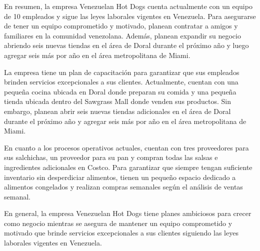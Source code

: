 En resumen, la empresa Venezuelan Hot Dogs cuenta actualmente con un equipo de 10 empleados y sigue las leyes laborales vigentes en Venezuela. Para asegurarse de tener un equipo comprometido y motivado, planean contratar a amigos y familiares en la comunidad venezolana. Además, planean expandir su negocio abriendo seis nuevas tiendas en el área de Doral durante el próximo año y luego agregar seis más por año en el área metropolitana de Miami.

La empresa tiene un plan de capacitación para garantizar que sus empleados brinden servicios excepcionales a sus clientes. Actualmente, cuentan con una pequeña cocina ubicada en Doral donde preparan su comida y una pequeña tienda ubicada dentro del Sawgrass Mall donde venden sus productos. Sin embargo, planean abrir seis nuevas tiendas adicionales en el área de Doral durante el próximo año y agregar seis más por año en el área metropolitana de Miami.

En cuanto a los procesos operativos actuales, cuentan con tres proveedores para sus salchichas, un proveedor para su pan y compran todas las salsas e ingredientes adicionales en Costco. Para garantizar que siempre tengan suficiente inventario sin desperdiciar alimentos, tienen un pequeño espacio dedicado a alimentos congelados y realizan compras semanales según el análisis de ventas semanal.

En general, la empresa Venezuelan Hot Dogs tiene planes ambiciosos para crecer como negocio mientras se asegura de mantener un equipo comprometido y motivado que brinde servicios excepcionales a sus clientes siguiendo las leyes laborales vigentes en Venezuela.